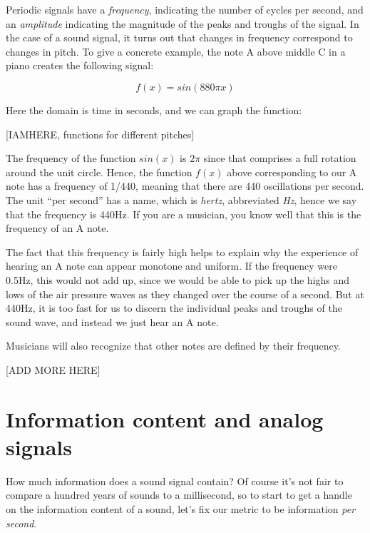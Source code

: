 \documentclass[UTF8]{book}
\begin{document}
\begin{CJK}{UTF8}{gbsn}
Periodic signals have a \emph{frequency}, indicating the number of cycles per second, and an \emph{amplitude} indicating the magnitude of the peaks and troughs of the signal. In the case of a sound signal, it turns out that changes in frequency correspond to changes in pitch. To give a concrete example, the note A above middle C in a piano creates the following signal:

\[ f(x) = sin(880\pi x) \]

Here the domain is time in seconds, and we can graph the function:


[IAMHERE, functions for different pitches]

The frequency of the function $sin(x)$ is $2\pi$ since that comprises a full rotation around the unit circle. Hence, the function $f(x)$ above corresponding to our A note has a frequency of 1/440, meaning that there are 440 oscillations per second. The unit ``per second'' has a name, which is \emph{hertz}, abbreviated \emph{Hz}, hence we say that the frequency is 440Hz. If you are a musician, you know well that this is the frequency of an A note.

The fact that this frequency is fairly high helps to explain why the experience of hearing an A note can appear monotone and uniform. If the frequency were 0.5Hz, this would not add up, since we would be able to pick up the highs and lows of the air pressure waves as they changed over the course of a second. But at 440Hz, it is too fast for us to discern the individual peaks and troughs of the sound wave, and instead we just hear an A note.

Musicians will also recognize that other notes are defined by their frequency.

[ADD MORE HERE]

\section{Information content and analog signals}

How much information does a sound signal contain? Of course it's not fair to compare a hundred years of sounds to a millisecond, so to start to get a handle on the information content of a sound, let's fix our metric to be information \emph{per second}.


\end{CJK}
\end{document}
